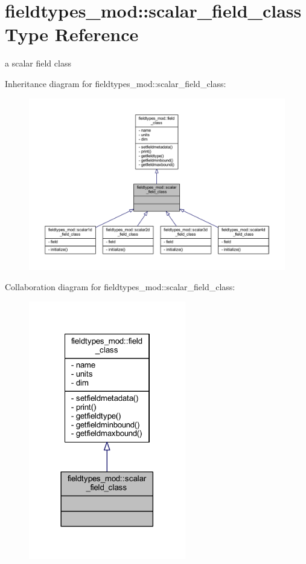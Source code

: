 \hypertarget{structfieldtypes__mod_1_1scalar__field__class}{}\section{fieldtypes\+\_\+mod\+:\+:scalar\+\_\+field\+\_\+class Type Reference}
\label{structfieldtypes__mod_1_1scalar__field__class}


a scalar field class  




Inheritance diagram for fieldtypes\+\_\+mod\+:\+:scalar\+\_\+field\+\_\+class\+:\nopagebreak
\begin{figure}[H]
\begin{center}
\leavevmode
\includegraphics[width=350pt]{structfieldtypes__mod_1_1scalar__field__class__inherit__graph}
\end{center}
\end{figure}


Collaboration diagram for fieldtypes\+\_\+mod\+:\+:scalar\+\_\+field\+\_\+class\+:\nopagebreak
\begin{figure}[H]
\begin{center}
\leavevmode
\includegraphics[width=194pt]{structfieldtypes__mod_1_1scalar__field__class__coll__graph}
\end{center}
\end{figure}


